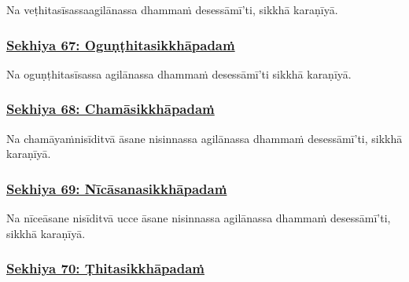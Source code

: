 Na veṭhitasīsassa\makeatletter\hyperlink{endnote517-appendix}\makeatother \thinspace agilānassa dhammaṁ desessāmī'ti, sikkhā karaṇīyā.



\subsubsection*{\hyperref[training67]{Sekhiya 67: Oguṇṭhitasikkhāpadaṁ}}
\label{sekh67}

Na oguṇṭhitasīsassa agilānassa dhammaṁ desessāmī'ti sikkhā karaṇīyā.



\subsubsection*{\hyperref[training68]{Sekhiya 68: Chamāsikkhāpadaṁ}}
\label{sekh68}

Na chamāyaṁ\makeatletter\hyperlink{endnote518-appendix}\makeatother \thinspace nisīditvā āsane nisinnassa agilānassa dhammaṁ desessāmī'ti, sikkhā karaṇīyā.



\subsubsection*{\hyperref[training69]{Sekhiya 69: Nīcāsanasikkhāpadaṁ}}
\label{sekh69}

Na nīce\makeatletter\hyperlink{endnote519-appendix}\makeatother \thinspace āsane nisīditvā ucce āsane nisinnassa agilānassa dhammaṁ desessāmī'ti, sikkhā karaṇīyā.



\subsubsection*{\hyperref[training70]{Sekhiya 70: Ṭhitasikkhāpadaṁ}}
\label{sekh70}

